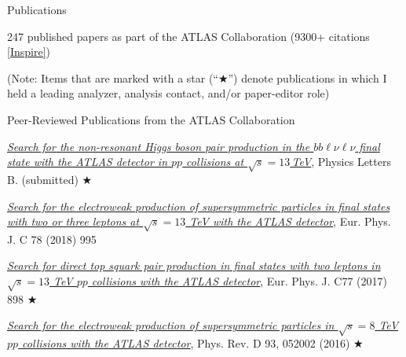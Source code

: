 
\newpage
\vspace{0.25in}
{\Large Publications}\\
\HRule

\vspace{0.15in}
\hspace{0.25in}\begin{minipage}{0.8\textwidth}

247 published papers as part of the ATLAS Collaboration (9300+ citations \href{https://inspirehep.net/author/profile/D.J.Antrim.1}{[Inspire]})

\vspace{0.15in}
(Note: Items that are marked with a star (``$\bigstar$'') denote publications in which I held a leading analyzer, analysis contact, and/or paper-editor role)


\vspace{0.15in}
\hspace{0.2in}Peer-Reviewed Publications from the ATLAS Collaboration

\hspace{0.35in}\begin{minipage}{1.0\textwidth}

\vspace{0.15in}
\href{https://arxiv.org/abs/1908.06765}{\textit{Search for the non-resonant Higgs boson pair production in the $bb\ell\nu\ell\nu$ final state with the ATLAS detector in $pp$ collisions at $\sqrt{s} = 13$\,TeV}}, Physics Letters B. (submitted) $\bigstar$

\vspace{0.15in}
\href{https://arxiv.org/abs/1803.02762}{\textit{Search for the electroweak production of supersymmetric particles in final states with
two or three leptons at $\sqrt{s} = 13$ TeV with the ATLAS detector}}, Eur. Phys. J. C 78 (2018) 995

\vspace{0.15in}
\href{https://arxiv.org/abs/1708.03247}{\textit{Search for direct top squark pair production in final states with two leptons
in $\sqrt{s} = 13$ TeV $pp$ collisions with the ATLAS detector}}, Eur. Phys. J. C77 (2017) 898 $\bigstar$

\vspace{0.15in}
\href{https://arxiv.org/abs/1509.07152}{\textit{Search for the electroweak production of supersymmetric particles in
$\sqrt{s} = 8$ TeV $pp$ collisions with the ATLAS detector}}, Phys. Rev. D 93, 052002 (2016) $\bigstar$



\end{minipage}
\end{minipage}
